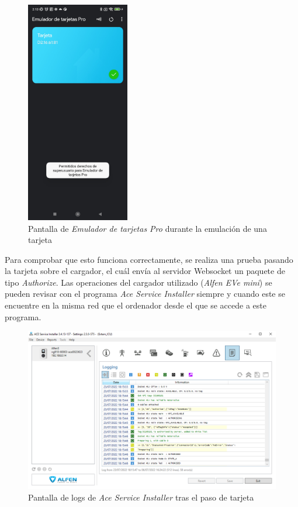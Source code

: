 \documentclass[12pt,a4paper,onecolumn,oneside]{report}
\begin{document}
\begin{figure}[H] 
\centering
  \includegraphics[width=0.4\textwidth]{figuras/root8.png}
  \caption[Pantalla de \textit{Emulador de tarjetas Pro} durante la emulación de una tarjeta]{Pantalla de \textit{Emulador de tarjetas Pro} durante la emulación de una tarjeta\\
  }
  \label{fig:root8}
\end{figure}

Para comprobar que esto funciona correctamente, se realiza una prueba pasando la tarjeta sobre el cargador, el cuál envía al servidor Websocket un paquete de tipo \textit{Authorize}. Las operaciones del cargador utilizado (\textit{Alfen EVe mini}) se pueden revisar con el programa \textit{Ace Service Installer} siempre y cuando este se encuentre en la misma red que el ordenador desde el que se accede a este programa.


\begin{figure}[H] 
\centering
  \includegraphics[width=1\textwidth]{figuras/authorize1.png}
  \caption[Pantalla de logs de \textit{Ace Service Installer} tras el paso de tarjeta]{Pantalla de logs de \textit{Ace Service Installer} tras el paso de tarjeta\\
  }
  \label{fig:authorize1}
\end{figure}
\end{document}
